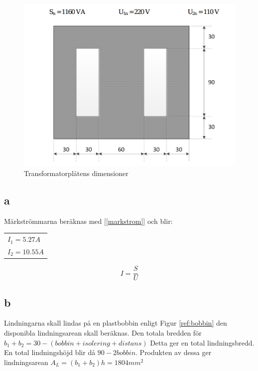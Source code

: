 \documentclass{article}
\begin{document}
 \begin{figure}[H]
 \begin{center}
 \includegraphics[width=1\textwidth]{img/transformatorplat.png} %
 \caption{Transformatorplåtens dimensioner}
 \end{center}
 \end{figure}

\subsection{a}
Märkströmmarna beräknas med [\ref{markstrom}] och blir:
\begin{tabular}{|l}
  $I_1=5.27 A$\\
  $I_2=10.55 A$\\
\end{tabular}

\begin{equation}
  I=\frac{S}{U}
  \label{markstrom}
\end{equation}

\subsection{b}
Lindningarna skall lindas på en plastbobbin enligt Figur \ref{ref:bobbin} den disponibla lindningsarean skall beräknas.
Den totala bredden för $b_1+b_2=30-(bobbin+isolering+distans)$ Detta ger en total lindningsbredd.
En total lindningshöjd blir då $90-2bobbin$.
Produkten av dessa ger lindningsarean $A_L=(b_1+b_2)h=1804 mm^2$
\end{document}
